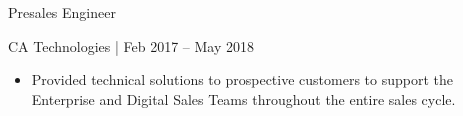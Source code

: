 \documentclass[10pt]{article}
\begin{document}
\begin{minipage}[t]{0.6\linewidth}

	{\fontsize{14}{20}\selectfont \textcolor{black!65}{Presales Engineer}}

\vspace{.1cm}

	{\fontsize{10}{12}\selectfont 
		\textcolor{black!65}{CA Technologies | Feb 2017 -- May 2018}}

\vspace{-0.75cm}

	{\fontsize{13}{16}\selectfont \textcolor{black!45}{
		\begin{justify}
			 \renewcommand{\labelitemi}{-}
			 \begin{itemize}[leftmargin=*]
		        \setlength\itemsep{-0.25em}
			    \item Provided technical solutions to prospective customers to support the Enterprise and Digital Sales Teams throughout the entire sales cycle.
			\end{itemize}
		\end{justify}}}
\end{minipage}
\hspace{5mm}
\end{document}
